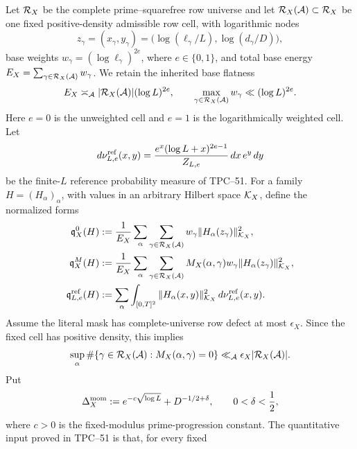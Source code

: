 Let \(\mathcal R_X\) be the complete prime--squarefree row universe and let
\(\mathcal R_X(\mathcal A)\subset\mathcal R_X\) be one fixed positive-density admissible
row cell,
with logarithmic nodes
\[
 z_\gamma=(x_\gamma,y_\gamma)
 =\bigl(\log(\ell_\gamma/L),\log(d_\gamma/D)\bigr),
\]
 base weights \(w_\gamma=(\log\ell_\gamma)^{2e}\), where
 \(e\in\{0,1\}\), and total base energy
\(E_X=\sum_{\gamma\in\mathcal R_X(\mathcal A)}w_\gamma\).  We retain the inherited
base flatness
\begin{equation}
 E_X\asymp_{\mathcal A}|\mathcal R_X(\mathcal A)|(\log L)^{2e},
 \qquad
 \max_{\gamma\in\mathcal R_X(\mathcal A)}w_\gamma\ll(\log L)^{2e}.
 \label{eq:tpc52-cosine-base-flatness}
\end{equation}
Here \(e=0\) is the unweighted cell and \(e=1\) is the
logarithmically weighted cell.  Let
\begin{equation}
 d\nu_{L,e}^{\rm ref}(x,y)
 =\frac{e^x(\log L+x)^{2e-1}}{Z_{L,e}}\,dx\,e^y\,dy
 \label{eq:tpc52-finite-row-reference-measure}
\end{equation}
be the finite-\(L\) reference probability measure of TPC--51.  For a
family \(H=(H_\alpha)_\alpha\), with values in an arbitrary Hilbert
space \(\mathcal K_X\), define the normalized forms
\begin{align}
 \mathfrak q_X^0(H)
 &:=\frac1{E_X}\sum_\alpha
   \sum_{\gamma\in\mathcal R_X(\mathcal A)}
   w_\gamma\|H_\alpha(z_\gamma)\|_{\mathcal K_X}^2,
 \label{eq:tpc52-unmasked-row-form}\\
 \mathfrak q_X^M(H)
 &:=\frac1{E_X}\sum_\alpha
   \sum_{\gamma\in\mathcal R_X(\mathcal A)}
   M_X(\alpha,\gamma)w_\gamma
   \|H_\alpha(z_\gamma)\|_{\mathcal K_X}^2,
 \label{eq:tpc52-masked-row-form}\\
 \mathfrak q_{L,e}^{\rm ref}(H)
 &:=\sum_\alpha\int_{[0,T]^2}
   \|H_\alpha(x,y)\|_{\mathcal K_X}^2
   \,d\nu_{L,e}^{\rm ref}(x,y).
 \label{eq:tpc52-reference-row-form}
\end{align}
Assume the literal mask has complete-universe row defect at most
\(\epsilon_X\).  Since the fixed cell has positive density, this implies
\begin{equation}
 \sup_\alpha
 \#\{\gamma\in\mathcal R_X(\mathcal A):M_X(\alpha,\gamma)=0\}
 \ll_{\mathcal A}\epsilon_X|\mathcal R_X(\mathcal A)|.
 \label{eq:tpc52-cosine-cell-mask-defect}
\end{equation}
Put
\begin{equation}
 \Delta_X^{\rm mom}
 :=e^{-c\sqrt{\log L}}+D^{-1/2+\delta},
 \qquad 0<\delta<\frac12,
 \label{eq:tpc52-arithmetic-moment-error}
\end{equation}
where \(c>0\) is the fixed-modulus prime-progression constant.
The quantitative input proved in TPC--51 is that, for every fixed
